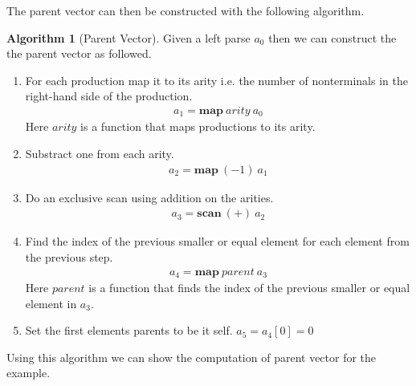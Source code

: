 \documentclass[a4paper,12pt]{article}
\theoremstyle{definition}
\newtheorem{algorithm}{Algorithm}[section]
\begin{document}
The parent vector can then be constructed with the following algorithm.
\begin{algorithm}[Parent Vector]\label{algo:parent}
  Given a left parse $a_0$ then we can construct the the parent vector as followed.
  \begin{enumerate}
    \item For each production map it to its arity i.e. the number of nonterminals in the right-hand side of the production.
    \begin{align*}
      a_1 = \mathbf{map} \: arity \: a_0
    \end{align*}
    Here $arity$ is a function that maps productions to its arity.
    \item Substract one from each arity.
    \begin{align*}
      a_2 = \mathbf{map} \: (-1) \: a_1
    \end{align*}
    \item Do an exclusive scan using addition on the arities.
    \begin{align*}
      a_3 = \mathbf{scan} \: (+) \: a_2
    \end{align*}
    \item Find the index of the previous smaller or equal element for each element from the previous step. 
    \begin{align*}
      a_4 = \mathbf{map} \: parent \: a_3
    \end{align*}
    Here $parent$ is a function that finds the index of the previous smaller or equal element in $a_3$.
    \item Set the first elements parents to be it self. $a_5 = a_4[0] = 0$
  \end{enumerate}
\end{algorithm}
Using this algorithm we can show the computation of parent vector for the example.
\end{document}

